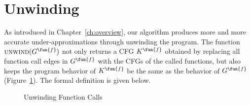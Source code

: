
\section{Unwinding}\label{sec:unwinding}
As introduced in Chapter~\ref{ch:overview}, our algorithm produces more and more
accurate under-approximations through unwinding the program.
The function $\textsc{unwind}(G^\fun{f})$ not only returns a CFG $K^\fun{f}$
obtained by replacing all function call edges in $G^\fun{f}$ with the CFGs of
the called functions,
but also keeps the program behavior of $K^\fun{f}$ be the same as the behavior
of $G^\fun{f}$ (Figure~\ref{figure:unwinding}).
The formal definition is given below.

\begin{figure}[t]
  \centering

  \caption{Unwinding Function Calls}
  \label{figure:unwinding}
\end{figure}

